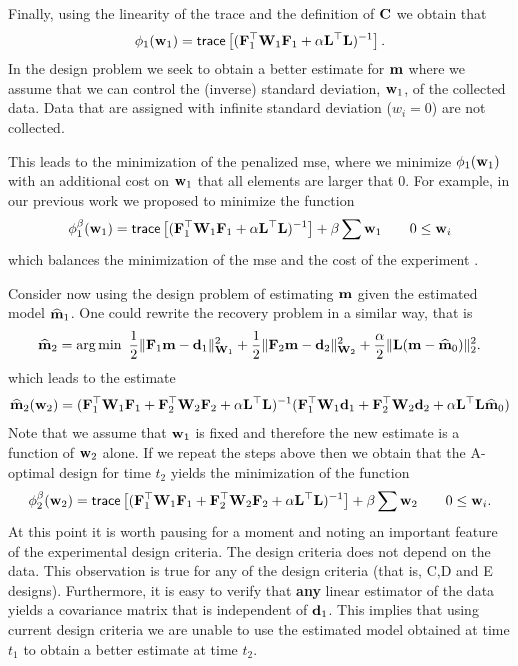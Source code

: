 \documentclass[final,leqno,onefignum,onetabnum]{siamltexmm}
\begin{document}
%
Finally, using the linearity of the trace and the definition of ${\bf{C}}$ we obtain that
%
\begin{align}
\label{design1}
\phi_{1}(\bfw_1 ) =  {\sf trace} \left[   (\bfF_{1}^{\top}\bfW_{1}\bfF_{1}   + 
 {\alpha} \LtL)^{-1} \right]. 
\end{align}
%
In the design problem we seek to obtain a better estimate for ${\bf{m}}$ where we assume
that we can control the (inverse) standard deviation, ${\bf{w}}_{1}$, of the collected data.
Data that are assigned with infinite standard deviation ($w_i = 0$) are not collected.
 
This leads to the minimization of the penalized mse, where 
we minimize $\phi_{1}({\bf{w}}_{1})$ with an additional cost on ${\bf{w}}_{1}$ that all elements are larger that $0$.
 For example, in our
previous work we proposed to minimize the function
%
\begin{align}
\label{designp1}
\phi_{1}^{\beta}(\bfw_1 ) =  {\sf trace} \left[   (\bfF_{1}^{\top}\bfW_{1}\bfF_{1}   + 
 {\alpha} \LtL)^{-1} \right]  + \beta \sum \bfw_{1} \quad \quad 0 \le \bfw_i 
\end{align}
%
which balances the minimization of the mse and the cost of the experiment \cite{Haber2008}.

Consider now using the design problem of estimating ${\bf{m}}$ given the estimated model $\widehat {{\bf{m}}}_{1}$.
One could rewrite the recovery problem in a similar way,
that is
%
\begin{align}
\label{mest2}
\bfmhat_{2} = {\rm arg}\min\ \hf \| \bfF_{1} \bfm - \bfd_{1}\|^{2}_{\bfW_{1}} + \hf \| \bfF_{2} \bfm - \bfd_{2}\|^{2}_{\bfW_{2}}  + {\frac {\alpha} 2}
\|\bfL (\bfm -\bfmhat_{0}) \|^{2}_2. 
\end{align}
%
which leads to the estimate
%
\begin{align}
{\widehat{{\bf{m}}}}_{2}({\bf{w}}_{2}) = ({\bf{F}}_{1}^{\top} {\bf{W}}_{1}{\bf{F}}_{1} +
{\bf{F}}_{2}^{\top} {\bf{W}}_{2}{\bf{F}}_{2} + \alpha {\bf{L}}^{\top}{\bf{L}})^{-1} ({\bf{F}}_{1}^{\top} {\bf{W}}_{1} {\bf{d}}_{1} +{\bf{F}}_{2}^{\top} {\bf{W}}_{2} {\bf{d}}_{2}
+ \alpha {\bf{L}}^{\top}{\bf{L}} {\widehat{{\bf{m}}}}_{0})
\end{align}
%
Note that we assume that ${\bf{w}}_{1}$ is fixed and therefore the new estimate is a function of ${\bf{w}}_{2}$ alone.
If we repeat the steps above then we obtain that the A-optimal design for time $t_{2}$ yields the minimization of
the function
%
\begin{align}
\label{design2na}
\phi_{2}^{\beta}(\bfw_{2} ) =  {\sf trace} \left[   (\bfF_{1}^{\top}\bfW_{1}\bfF_{1}   + \bfF_{2}^{\top}\bfW_{2}\bfF_{2} +
\alpha \LtL)^{-1} \right] + \beta \sum \bfw_{2}\quad \quad 0 \le \bfw_i . 
\end{align}
%
At this point it is worth  pausing for a moment and noting an important feature of the experimental design criteria. 
The design criteria does not depend on the data. This observation is true for any of the design criteria  (that is, C,D and E designs). 
Furthermore, it is easy to verify that {\bf any} linear estimator of the data 
yields a covariance matrix that is independent of ${\bf{d}}_{1}$.
This implies that using current design criteria we are unable to
use the estimated model obtained at time $t_{1}$  to obtain a better estimate at time $t_{2}$.
\end{document}
